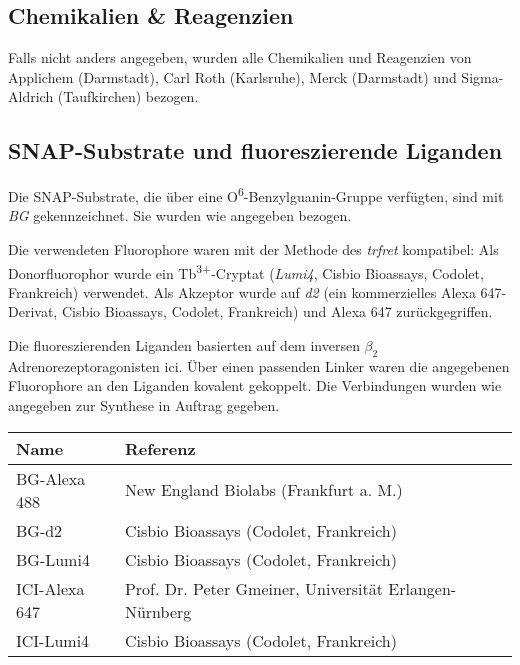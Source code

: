 \subsection{Chemikalien \& Reagenzien}\label{chemikalien}
Falls nicht anders angegeben, wurden alle Chemikalien und Reagenzien von Applichem (Darmstadt), Carl Roth (Karlsruhe), Merck (Darmstadt) und Sigma-Aldrich (Taufkirchen) bezogen. 

\subsection{SNAP-Substrate und fluoreszierende Liganden} \label{substrate}

Die SNAP-Substrate, die über eine O\textsuperscript{6}-Benzylguanin-Gruppe verfügten, sind mit \textit{BG} gekennzeichnet. Sie wurden wie angegeben bezogen.

Die verwendeten Fluorophore waren mit der Methode des \textit{\gls{trfret}} kompatibel: Als Donorfluorophor wurde ein Tb\textsuperscript{3+}-Cryptat (\textit{Lumi4}, Cisbio Bioassays, Codolet, Frankreich) verwendet.  Als Akzeptor wurde auf \textit{d2} (ein kommerzielles Alexa 647-Derivat, Cisbio Bioassays, Codolet, Frankreich) und Alexa 647 zurückgegriffen.

Die fluoreszierenden Liganden basierten auf dem inversen $\beta_2$\-Adrenorezeptoragonisten \gls{ici}. Über einen passenden Linker waren die angegebenen Fluorophore an den Liganden kovalent gekoppelt. Die Verbindungen wurden wie angegeben zur Synthese in Auftrag gegeben.

\begin{table}[htsb]
\begin{tabularx}{\textwidth}{lll}
\toprule
Name							&	Referenz\\
\midrule
BG-Alexa 488						&	New England Biolabs (Frankfurt a. M.)\\
BG-d2							&	Cisbio Bioassays (Codolet, Frankreich)\\
BG-Lumi4						&	Cisbio Bioassays (Codolet, Frankreich)\\
\midrule
ICI-Alexa 647					&	Prof. Dr. Peter Gmeiner, Universität Erlangen-Nürnberg\\
ICI-Lumi4						& 	Cisbio Bioassays (Codolet, Frankreich)\\
\bottomrule
\end{tabularx}
\end{table}

